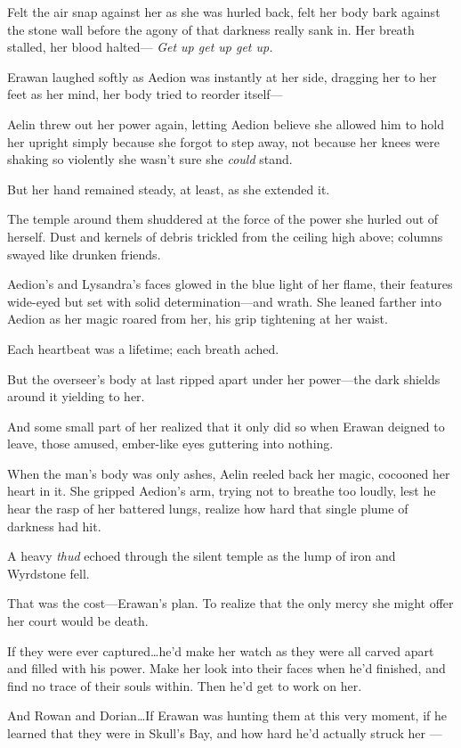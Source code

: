 Felt the air snap against her as she was hurled back, felt her body bark against the stone wall before the agony of that darkness really sank in.
Her breath stalled, her blood halted--- \emph{Get up get up get up.}

Erawan laughed softly as Aedion was instantly at her side, dragging her to her feet as her mind, her body tried to reorder itself---

Aelin threw out her power again, letting Aedion believe she allowed him to hold her upright simply because she forgot to step away, not because her knees were shaking so violently she wasn't sure she \emph{could}
stand.

But her hand remained steady, at least, as she extended it.

The temple around them shuddered at the force of the power she hurled out of herself.
Dust and kernels of debris trickled from the ceiling high above; columns swayed like drunken friends.

Aedion's and Lysandra's faces glowed in the blue light of her flame, their features wide-eyed but set with solid determination---and wrath.
She leaned farther into Aedion as her magic roared from her, his grip tightening at her waist.

Each heartbeat was a lifetime; each breath ached.

But the overseer's body at last ripped apart under her power---the dark shields around it yielding to her.

And some small part of her realized that it only did so when Erawan deigned to leave, those amused, ember-like eyes guttering into nothing.

When the man's body was only ashes, Aelin reeled back her magic, cocooned her heart in it.
She gripped Aedion's arm, trying not to breathe too loudly, lest he hear the rasp of her battered lungs, realize how hard that single plume of darkness had hit.

A heavy \emph{thud} echoed through the silent temple as the lump of iron and Wyrdstone fell.

That was the cost---Erawan's plan.
To realize that the only mercy she might offer her court would be death.

If they were ever captured\ldots he'd make her watch as they were all carved apart and filled with his power.
Make her look into their faces when he'd finished, and find no trace of their souls within.
Then he'd get to work on her.

And Rowan and Dorian\ldots If Erawan was hunting them at this very moment, if he learned that they were in Skull's Bay, and how hard he'd actually struck her ---

